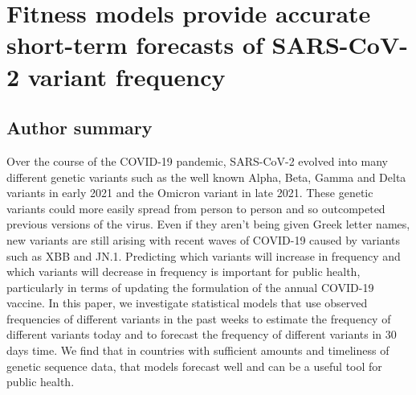 \graphicspath{{./chapters/ncov-forecasting-fit/}}

\chapter{Fitness models provide accurate short-term forecasts of SARS-CoV-2 variant frequency}

\section*{Author summary}

Over the course of the COVID-19 pandemic, SARS-CoV-2 evolved into many different genetic variants such as the well known Alpha, Beta, Gamma and Delta variants in early 2021 and the Omicron variant in late 2021.
These genetic variants could more easily spread from person to person and so outcompeted previous versions of the virus. Even if they aren’t being given Greek letter names, new variants are still arising with recent waves of COVID-19 caused by variants such as XBB and JN.1.
Predicting which variants will increase in frequency and which variants will decrease in frequency is important for public health, particularly in terms of updating the formulation of the annual COVID-19 vaccine.
In this paper, we investigate statistical models that use observed frequencies of different variants in the past weeks to estimate the frequency of different variants today and to forecast the frequency of different variants in 30 days time.
We find that in countries with sufficient amounts and timeliness of genetic sequence data, that models forecast well and can be a useful tool for public health.

